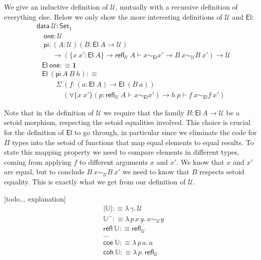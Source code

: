 \documentclass{easychair}
\newcommand{\setoidU}{\mathcal{U}}
\newcommand{\Set}{\textsf{Set}}
\newcommand{\El}{\textsf{El}}
\newcommand{\Uty}{\mathds{U}}
\newcommand{\reflu}{\textsf{refl}_\setoidU}
\newcommand{\equ}[2]{#1 \sim_\setoidU #2}
\newcommand{\eqel}[3]{#1 \vdash #2 \sim_\El #3}
\begin{document}

We give an inductive definition of $\setoidU$, mutually with a recursive
definition of everything else. Below we only show the more interesting definitions of $\setoidU$ and $\El$:
%
\begin{align*}
  & \textsf{data}\ \setoidU : \Set_1 \\
  & \quad \textsf{one} : \setoidU \\
  & \quad \textsf{pi}
  :  (A : \setoidU) (B : \El\ A \to \setoidU)\\
  & \ \qquad \to (\{x\ x' : \El\ A\} \to \textsf{refl}_\setoidU\ A \vdash x \sim_\El x' \to B\ x \sim_\setoidU B\ x')
  \to \setoidU
\end{align*}
%
\begin{align*}
  & \El\ \textsf{one} :\equiv \textbf{1} \\
  & \El\ (\textsf{pi}\ A\ B\ h) :\equiv \\
  & \qquad \Sigma\ (f : (a : \El\ A) \to \El\ (B\ a)) \\
  & \qquad \quad
  (\forall\{x\ x'\}(p : \eqel{\reflu\ A}{x}{x'}) \to \eqel{h\ p}{f\ x}{f\ x'})
\end{align*}

Note that in the definition of $\setoidU$ we require that the family $B : \El\ A
\to \setoidU$ be a setoid morphism, respecting the setoid equalities involved.
%
This choice is crucial for the definition of $\El$ to go through, in particular
since we eliminate the code for $\Pi$ types into the setoid of functions that
map equal elements to equal results. To state this mapping property we need to
compare elements in different types, coming from applying $f$ to different
arguments $x$ and $x'$. We know that $x$ and $x'$ are equal, but to conclude
$\equ{B\ x}{B\ x'}$ we need to know that $B$ respects setoid equality. This is
exactly what we get from our definition of $\setoidU$.

[todo... explanation]
%
\begin{align*}
  & | \Uty | :\equiv \lambda\, \gamma . \, \setoidU \\
  & \Uty^\sim :\equiv \lambda \,p\, x\, y . \,x \sim_{\setoidU} y \\
  & \textsf{refl}\ \Uty :\equiv \reflu \\
  & ... \\
  & \textsf{coe}\ \Uty :\equiv \lambda\,p\,a . \, a \\
  & \textsf{coh}\ \Uty :\equiv \lambda\,p . \, \reflu
\end{align*}
\end{document}
